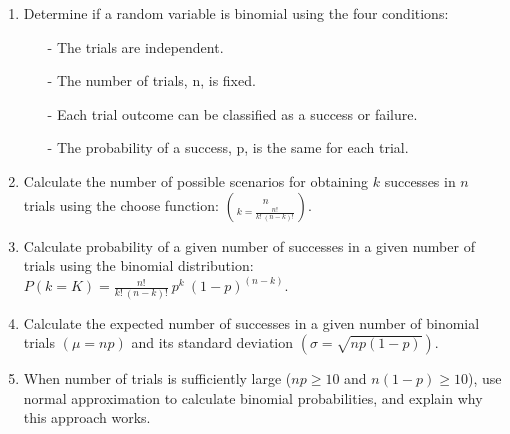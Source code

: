 \documentclass[11pt]{article}
\begin{document}
%

\vspace{0.25cm}

%

\begin{enumerate}[resume]
\renewcommand\labelenumi{\textcolor{oiB}{\textbf{LO \theenumi.}}}

\item Determine if a random variable is binomial using the four conditions:
\begin{itemize}
\item[-] The trials are independent. 
\item[-] The number of trials, n, is fixed. 
\item[-] Each trial outcome can be classified as a success or failure. 
\item[-] The probability of a success, p, is the same for each trial. 
\end{itemize}

\item Calculate the number of possible scenarios for obtaining $k$ successes in $n$ trials using the choose function: $n \choose k = \frac{n!}{k!~(n - k)!}$.

\item Calculate probability of a given number of successes in a given number of trials using the binomial distribution: $P(k = K) = \frac{n!}{k!~(n - k)!}~p^k~(1-p)^{(n - k)}$. 

\item Calculate the expected number of successes in a given number of binomial trials $(\mu = np)$ and its standard deviation $(\sigma = \sqrt{np(1-p)})$.

\item When number of trials is sufficiently large ($np \ge 10$ and $n(1-p) \ge 10$), use normal approximation to calculate binomial probabilities, and explain why this approach works.

\end{enumerate}

%
\end{document}
